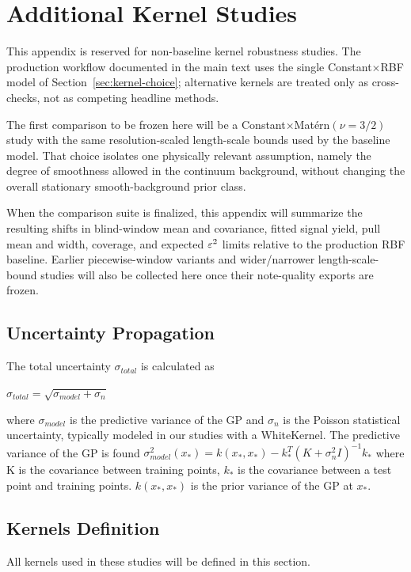\section{Additional Kernel Studies}
\label{app:kernel-studies}

This appendix is reserved for non-baseline kernel robustness studies. The production
workflow documented in the main text uses the single Constant$\times$RBF model of
Section~\ref{sec:kernel-choice}; alternative kernels are treated only as cross-checks,
not as competing headline methods.

The first comparison to be frozen here will be a Constant$\times$Mat\'ern$(\nu=3/2)$
study with the same resolution-scaled length-scale bounds used by the baseline model.
That choice isolates one physically relevant assumption, namely the degree of smoothness
allowed in the continuum background, without changing the overall stationary
smooth-background prior class.

When the comparison suite is finalized, this appendix will summarize the resulting
shifts in blind-window mean and covariance, fitted signal yield, pull mean and width,
coverage, and expected $\varepsilon^2$ limits relative to the production RBF baseline.
Earlier piecewise-window variants and wider/narrower length-scale-bound studies will
also be collected here once their note-quality exports are frozen.
\subsection{Uncertainty Propagation}

The total uncertainty $\sigma_{total}$ is calculated as

$\sigma_{total} = \sqrt{\sigma_{model} + \sigma_{n}}$

where $\sigma_{model}$ is the predictive variance of the GP and $\sigma_n$ is the Poisson statistical uncertainty, typically modeled in our studies with a WhiteKernel. The predictive variance of the GP is found
$\sigma_{model}^2(x_*) = k(x_*, x_*) - k_*^T \left( K + \sigma_n^2 I \right)^{-1} k_*$
where K is the covariance between training points, $k_*$ is the covariance between a test point and training points. $k(x_*,x_*)$ is the prior variance of the GP at $x_*$.

\subsection{Kernels Definition}
All kernels used in these studies will be defined in this section.
